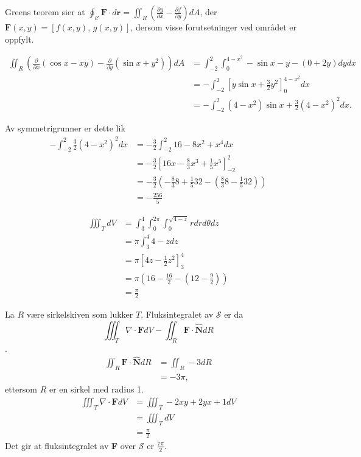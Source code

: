 \documentclass[11pt, a4paper, norsk]{NTNUoving}
\newenvironment{pkt}{\begin{punkt}}{\end{punkt}}
\begin{document}
\begin{oppgave}
    Greens teorem sier at $\oint_\mathcal{C}\textbf{F}\cdot d\textbf{r}=\iint_R\left(\frac{\partial g}{\partial x}-\frac{\partial f}{\partial y}\right)dA$, der $\textbf{F}(x,y)=[f(x,y),\,g(x,y)]$, dersom visse forutsetninger ved området er oppfylt. 
    
    \begin{align*}
        \iint_R\left(\frac{\partial }{\partial x}(\cos x - xy)-\frac{\partial }{\partial y}(\sin x + y^2)\right)dA &= \int_{-2}^2\int_0^{4-x^2}-\sin x - y - (0+2y)dydx
        \\&=-\int_{-2}^2\left[y\sin x +\frac{3}{2}y^2\right]_0^{4-x^2}dx
        \\&=-\int_{-2}^2(4-x^2)\sin x +\frac{3}{2}(4-x^2)^2dx.
    \end{align*}
    
    Av symmetrigrunner er dette lik
    \begin{align*}
        -\int_{-2}^2 \frac{3}{2}(4-x^2)^2dx &= -\frac{3}{2}\int_{-2}^2 16 - 8x^2 + x^4dx
        \\&= -\frac{3}{2}\left[16x-\frac{8}{3}x^3+\frac{1}{5}x^5\right]_{-2}^2
        \\&= -\frac{3}{2}\left(-\frac{8}{3}8+\frac{1}{5}32-\left(\frac{8}{3}8-\frac{1}{5}32\right)\right)
        \\&=-\frac{256}{5}
    \end{align*}
    
\end{oppgave}
\begin{oppgave}
    \begin{pkt}
        \begin{align*}
            \iiint_TdV &= \int_3^4\int_0^{2\pi}\int_{0}^{\sqrt{4-z}}rdrd\theta dz
            \\&=\pi\int_3^4 4-zdz
            \\&=\pi\left[4z-\frac{1}{2}z^2\right]_3^4
            \\&=\pi\left(16-\frac{16}{2}-\left(12-\frac{9}{2}\right)\right)
            \\&=\frac{\pi}{2}
        \end{align*}
    \end{pkt}
    \begin{pkt}
    La $R$ være sirkelskiven som lukker $T$. Fluksintegralet av $\mathcal{S}$ er da
    $$\iiint_T\nabla\cdot \textbf{F}dV-\iint_R \textbf{F}\cdot \hat{\textbf{N}}dR$$.
        \begin{align*}
             \iint_R \textbf{F}\cdot \hat{\textbf{N}}dR &= \iint_R -3dR
             \\&=-3\pi,
        \end{align*}
        ettersom $R$ er en sirkel med radius 1.
        \begin{align*}
            \iiint_T\nabla\cdot \textbf{F}dV &= \iiint_T -2xy+2yx+1dV
            \\&= \iiint_TdV
            \\&=\frac{\pi}{2}
        \end{align*}
        Det gir at fluksintegralet av \textbf{F} over $\mathcal{S}$ er $\frac{7\pi}{2}$.
    \end{pkt}
\end{oppgave}
\end{document}
